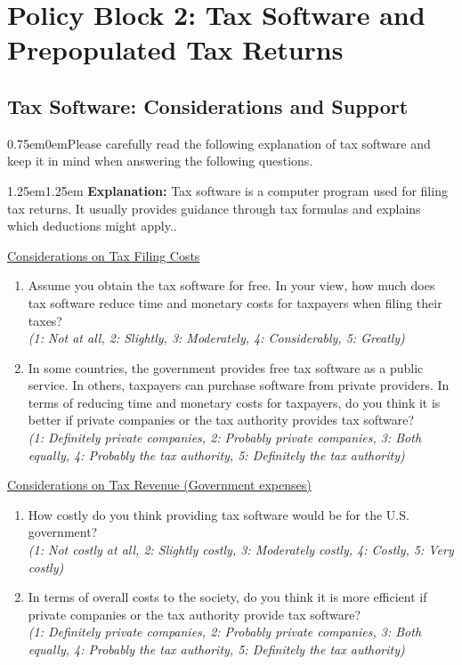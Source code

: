 \documentclass[11pt]{article}
\begin{document}
\section*{Policy Block 2: Tax Software and Prepopulated Tax Returns}
\subsection*{Tax Software: Considerations and Support} 
\vspace{0.5em}
\begin{adjustwidth}{0.75em}{0em}Please carefully read the following explanation of tax software and keep it in mind when answering the following questions. \end{adjustwidth}
\vspace{0.5em}
\begin{adjustwidth}{1.25em}{1.25em} \textbf{Explanation:} Tax software is a computer program used for filing tax returns. It usually provides guidance through tax formulas and explains which deductions might apply..
\end{adjustwidth}
\vspace{0.5em}
\underline{Considerations on Tax Filing Costs}
\begin{enumerate}[resume]
    \item Assume you obtain the tax software for free. In your view, how much does tax software reduce time and monetary costs for taxpayers when filing their taxes? \\
    \textit{(1: Not at all, 2: Slightly, 3: Moderately, 4: Considerably, 5: Greatly)} 
    \item In some countries, the government provides free tax software as a public service. In others, taxpayers can purchase software from private providers. In terms of reducing time and monetary costs for taxpayers, do you think it is better if private companies or the tax authority provides tax software? \\
    \textit{(1: Definitely private companies, 2: Probably private companies, 3: Both equally, 4: Probably the tax authority, 5: Definitely the tax authority)}
\end{enumerate}
\underline{Considerations on Tax Revenue (Government expenses)}
\begin{enumerate}[resume]
    \item How costly do you think providing tax software would be for the U.S. government? \\
    \textit{(1: Not costly at all, 2: Slightly costly, 3: Moderately costly, 4: Costly, 5: Very costly)} 
    \item In terms of overall costs to the society, do you think it is more efficient if private companies or the tax authority provide tax software?  \\
    \textit{(1: Definitely private companies, 2: Probably private companies, 3: Both equally, 4: Probably the tax authority, 5: Definitely the tax authority)}
\end{enumerate}
\end{document}
